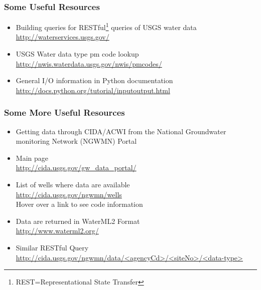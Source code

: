 \documentclass{beamer}
\begin{document}
\begin{frame}[fragile]
\frametitle{Some Useful Resources}
\begin{itemize}

\item Building queries for RESTful\footnote[1] {REST=Representational State Transfer} queries of USGS water data \\  \url{http://waterservices.usgs.gov/}
\item USGS Water data type pm code lookup \\
\url{http://nwis.waterdata.usgs.gov/nwis/pmcodes/}
\item General I/O information in Python documentation \\ 
\url{http://docs.python.org/tutorial/inputoutput.html}
\end{itemize}
\end{frame}

\begin{frame}[fragile]
\frametitle{Some More Useful Resources}
\begin{itemize}

\item Getting data through CIDA/ACWI from the National Groundwater monitoring Network (NGWMN) Portal
\item Main page \\
\url{http://cida.usgs.gov/gw_data_portal/}
\item List of wells where data are available \\
\url{http://cida.usgs.gov/ngwmn/wells} \\
Hover over a link to see code information
\item Data are returned in WaterML2 Format \\ 
\url{http://www.waterml2.org/}
\item Similar RESTful Query\\
\url{ http://cida.usgs.gov/ngwmn/data/<agencyCd>/<siteNo>/<data-type>}
\end{itemize}
\end{frame}
\end{document}
